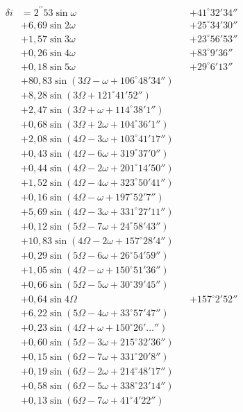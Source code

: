 \documentclass[10pt,a4paper]{article}
\begin{document}
\begin{align*}
\delta i &= 2^{\prime\prime}53 \sin \omega &&+ 41^{\circ}32'34'' \\
&+ 6,69 \sin 2\omega &&+ 25^{\circ}34'30'' \\
&+ 1,57 \sin 3\omega &&+ 23^{\circ}56'53'' \\
&+ 0,26 \sin 4\omega &&+ 83^{\circ}9'36'' \\
&+ 0,18 \sin 5\omega &&+ 29^{\circ}6'13'' \\
&+ 80,83 \sin(3\Omega - \omega + 106^{\circ}48'34'') \\
&+ 8,28 \sin(3\Omega + 121^{\circ}41'52'') \\
&+ 2,47 \sin(3\Omega + \omega + 114^{\circ}38'1'') \\
&+ 0,68 \sin(3\Omega + 2\omega + 104^{\circ}36'1'') \\
&+ 2,08 \sin(4\Omega - 3\omega + 103^{\circ}41'17'') \\
&+ 0,43 \sin(4\Omega - 6\omega + 319^{\circ}37'0'') \\
&+ 0,44 \sin(4\Omega - 2\omega + 201^{\circ}14'50'') \\
&+ 1,52 \sin(4\Omega - 4\omega + 323^{\circ}50'41'') \\
&+ 0,16 \sin(4\Omega - \omega + 197^{\circ}52'7'') \\
&+ 5,69 \sin(4\Omega - 3\omega + 331^{\circ}27'11'') \\
&+ 0,12 \sin(5\Omega - 7\omega + 24^{\circ}58'43'') \\
&+ 10,83 \sin(4\Omega - 2\omega + 157^{\circ}28'4'') \\
&+ 0,29 \sin(5\Omega - 6\omega + 26^{\circ}54'59'') \\
&+ 1,05 \sin(4\Omega - \omega + 150^{\circ}51'36'') \\
&+ 0,66 \sin(5\Omega - 5\omega + 30^{\circ}39'45'') \\
&+ 0,64 \sin 4\Omega &&+ 157^{\circ}2'52'' \\
&+ 6,22 \sin(5\Omega - 4\omega + 33^{\circ}57'47'') \\
&+ 0,23 \sin(4\Omega + \omega + 150^{\circ}26'\ldots'') \\
&+ 0,60 \sin(5\Omega - 3\omega + 215^{\circ}32'36'') \\
&+ 0,15 \sin(6\Omega - 7\omega + 331^{\circ}20'8'') \\
&+ 0,19 \sin(6\Omega - 2\omega + 214^{\circ}48'17'') \\
&+ 0,58 \sin(6\Omega - 5\omega + 338^{\circ}23'14'') \\
&+ 0,13 \sin(6\Omega - 7\omega + 41^{\circ}4'22'') \\

\end{align*}
\end{document}
